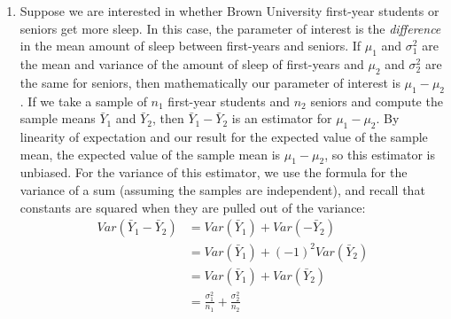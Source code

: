 \documentclass[notes.tex]{subfiles}
\begin{document}
\begin{enumerate}
\item Suppose we are interested in whether Brown University first-year students or seniors get more sleep. In this case, the parameter of interest is the \emph{difference} in the mean amount of sleep between first-years and seniors. If $\mu_1$ and $\sigma^2_1$ are the mean and variance of the amount of sleep of first-years and $\mu_2$ and $\sigma^2_2$ are the same for seniors, then mathematically our parameter of interest is $\mu_1 - \mu_2$. If we take a sample of $n_1$ first-year students and $n_2$ seniors and compute the sample means $\bar{Y}_1$ and $\bar{Y}_2$, then $\bar{Y}_1 - \bar{Y}_2$ is an estimator for $\mu_1 - \mu_2$. By linearity of expectation and our result for the expected value of the sample mean, the expected value of the sample mean is $\mu_1 - \mu_2$, so this estimator is unbiased. For the variance of this estimator, we use the formula for the variance of a sum (assuming the samples are independent), and recall that constants are squared when they are pulled out of the variance:
\begin{align*}
Var(\bar{Y}_1 - \bar{Y}_2) &= Var(\bar{Y}_1) + Var(-\bar{Y}_2) \\
&= Var(\bar{Y}_1) + (-1)^2 Var(\bar{Y}_2) \\
&= Var(\bar{Y}_1) + Var(\bar{Y}_2) \\
&= \frac{\sigma^2_1}{n_1} + \frac{\sigma^2_2}{n_2}
\end{align*}


\end{enumerate}
\end{document}
